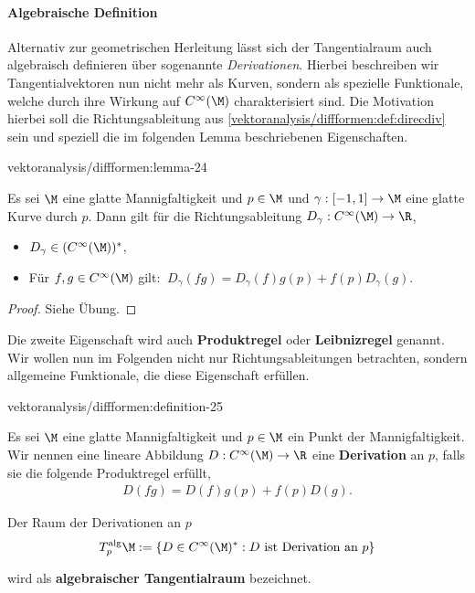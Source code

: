 \documentclass[letterpaper,10pt,english]{jupyterBook}
\begin{document}
\paragraph{Algebraische Definition}
\label{\detokenize{vektoranalysis/diffformen:algebraische-definition}}
\par
Alternativ zur geometrischen Herleitung lässt sich der Tangentialraum auch algebraisch definieren über sogenannte \emph{Derivationen}.
Hierbei beschreiben wir Tangentialvektoren nun nicht mehr als Kurven, sondern als spezielle Funktionale, welche durch ihre Wirkung auf \(C^\infty(\M)\) charakterisiert sind.
Die Motivation hierbei soll die Richtungsableitung aus \cref{vektoranalysis/diffformen:def:direcdiv} sein und speziell die im folgenden Lemma beschriebenen Eigenschaften.
\begin{lemma}{}{vektoranalysis/diffformen:lemma-24}



\par
Es sei \(\M\) eine glatte Mannigfaltigkeit und \(p\in\M\) und \(\gamma:[-1,1]\to\M\) eine glatte Kurve durch \(p\).
Dann gilt für die Richtungsableitung \(D_\gamma:C^\infty(\M)\to\R\),
\begin{itemize}
\item {} 
\par
\(D_\gamma\in (C^\infty(\M))^\ast\),

\item {} 
\par
Für \(f,g\in C^\infty(\M)\) gilt: \(\ D_\gamma(fg) = D_\gamma(f) g(p) + f(p) D_\gamma(g)\).

\end{itemize}
\end{lemma}

\begin{proof}
 Siehe Übung.
\end{proof}

\par
Die zweite Eigenschaft wird auch \textbf{Produktregel} oder \textbf{Leibnizregel} genannt.
Wir wollen nun im Folgenden nicht nur Richtungsableitungen betrachten, sondern allgemeine Funktionale, die diese Eigenschaft erfüllen.
\begin{definition}{}{vektoranalysis/diffformen:definition-25}



\par
Es sei \(\M\) eine glatte Mannigfaltigkeit und \(p\in\M\) ein Punkt der Mannigfaltigkeit.
Wir nennen eine lineare Abbildung \(D: C^\infty(\M) \to \R\) eine \textbf{Derivation} an \(p\), falls sie die folgende Produktregel erfüllt,
\begin{align*}
D(fg) = D(f) g(p) + f(p) D(g).
\end{align*}
\par
Der Raum der Derivationen an \(p\)
\begin{align*}
T^{\text{alg}}_p\M := \{D\in C^\infty(\M)^\ast: D\text{ ist Derivation an }p\}
\end{align*}
\par
wird als \textbf{algebraischer Tangentialraum} bezeichnet.
\end{definition}
\end{document}
